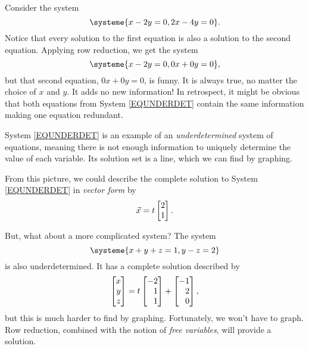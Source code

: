 Consider the system
	\begin{equation}
		\label{EQUNDERDET}
		\systeme{x-2y=0,2x-4y=0}.
	\end{equation}
	Notice that every solution to the first equation is also a solution to the second equation.
	Applying row reduction, we get the system
	\[
		\systeme{x-2y=0,0x+0y=0},
	\]
	but that second equation, $0x+0y=0$, is funny. It is always true, no matter the choice of $x$ and $y$.
	It adds no new information! In retrospect, it might be obvious that both equations from System \eqref{EQUNDERDET}
	contain the same information making one equation redundant.

	System \eqref{EQUNDERDET} is an example of an \emph{underdetermined} system of equations, meaning 
	there is not enough information to uniquely determine the value of each variable.
	Its solution
	set is a line, which we can find by graphing.
	
	\begin{center}
	\end{center}

	From this picture, we could describe the complete solution to System \eqref{EQUNDERDET} in \emph{vector form} by
	\[
		\vec x = t\mat{2\\1}.
	\]

	But, what about a more complicated system? The system
	\[
		\systeme{x+y+z=1,y-z=2}
	\]
	is also underdetermined. It has a complete solution described by
	\[
		\mat{x\\y\\z} =t\mat{-2\\1\\1} + \mat{-1\\2\\0},
	\]
	but this is much harder to find by graphing.
	Fortunately, we won't have to graph. Row reduction, combined with the notion of \emph{free variables},
	will provide a solution.

